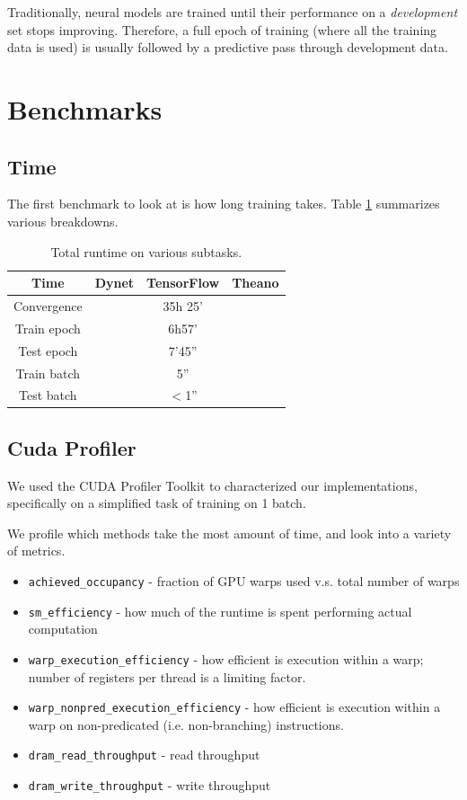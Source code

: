 \documentclass{article}
\begin{document}
Traditionally, neural models are trained until their performance on a \textit{development} set stops improving. Therefore, a full epoch of training (where all the training data is used) is usually followed by a predictive pass through development data.
\section{Benchmarks}
\subsection{Time}
The first benchmark to look at is how long training takes. Table \ref{tab:timing} summarizes various breakdowns.
\begin{table}
\begin{tabular}{c|ccc}
Time & Dynet & TensorFlow & Theano \\ \hline
Convergence & & 35h 25' & \\
Train epoch & & 6h57' &  \\
Test epoch & & 7'45'' & \\
Train batch & & 5'' &  \\
Test batch & & $<$1'' & \\
\end{tabular}
\caption{\label{tab:timing}Total runtime on various subtasks.}
\end{table}

\subsection{Cuda Profiler}
We used the CUDA Profiler Toolkit \cite{nvprof} to characterized our implementations, specifically on a simplified task of training on 1 batch.

We profile which methods take the most amount of time, and look into a variety of metrics.
\begin{itemize}
\item \verb!achieved_occupancy! - fraction of GPU warps used v.s. total number of warps
\item \verb!sm_efficiency! - how much of the runtime is spent performing actual computation
\item \verb!warp_execution_efficiency! - how efficient is execution within a warp; number of registers per thread is a limiting factor.
\item \verb!warp_nonpred_execution_efficiency! - how efficient is execution within a warp on non-predicated (i.e. non-branching) instructions.
\item \verb!dram_read_throughput! - read throughput
\item \verb!dram_write_throughput! - write throughput
\end{itemize}
\end{document}
